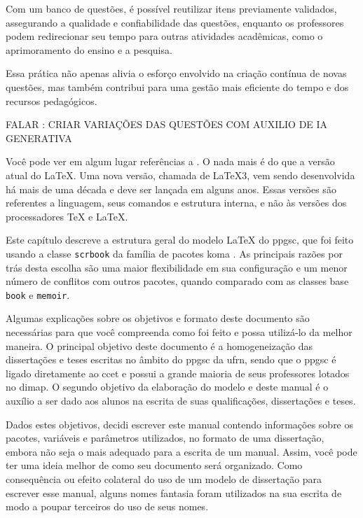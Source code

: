 Com um banco de questões, é possível reutilizar itens previamente validados, assegurando a qualidade e confiabilidade das questões, enquanto os professores podem redirecionar seu tempo para outras atividades acadêmicas, como o aprimoramento do ensino e a pesquisa.

Essa prática não apenas alivia o esforço envolvido na criação contínua de novas questões, mas também contribui para uma gestão mais eficiente do tempo e dos recursos pedagógicos. 


FALAR : CRIAR VARIAÇÕES DAS QUESTÕES COM AUXILIO DE IA GENERATIVA

Você pode ver em algum lugar referências a \LaTeXe{}. O \LaTeXe{} nada mais é do que a versão atual do \LaTeX{}. Uma nova versão, chamada de \LaTeX{}3, vem sendo desenvolvida há mais de uma década e deve ser lançada em alguns anos. Essas versões são referentes a linguagem, seus comandos e estrutura interna, e não às versões dos processadores \TeX{} e \LaTeX{}.

Este capítulo descreve a estrutura geral do modelo \LaTeX{} do \gls{ppgsc}, que foi feito usando a classe \texttt{scrbook} da família de pacotes \gls{koma} \parencite{koma}. As principais razões por trás desta escolha são uma maior flexibilidade em sua configuração e um menor número de conflitos com outros pacotes, quando comparado com as classes base \texttt{book} e \texttt{memoir}. 

Algumas explicações sobre os objetivos e formato deste documento são necessárias para que você compreenda como foi feito e possa utilizá-lo da melhor maneira. O principal objetivo deste documento é a homogeneização das dissertações e teses escritas no âmbito do \gls{ppgsc} da \gls{ufrn}, sendo que o \gls{ppgsc} é ligado diretamente ao \gls{ccet} e possui a grande maioria de seus professores lotados no \gls{dimap}. O segundo objetivo da elaboração do modelo e deste manual é o auxílio a ser dado aos alunos na escrita de suas qualificações, dissertações e teses.

Dados estes objetivos, decidi escrever este manual contendo informações sobre os pacotes, variáveis e parâmetros utilizados, no formato de uma dissertação, embora não seja o mais adequado para a escrita de um manual. Assim, você pode ter uma ideia melhor de como seu documento será organizado. Como consequência ou efeito colateral do uso de um modelo de dissertação para escrever esse manual, alguns nomes fantasia foram utilizados na sua escrita de modo a poupar terceiros do uso de seus nomes.

